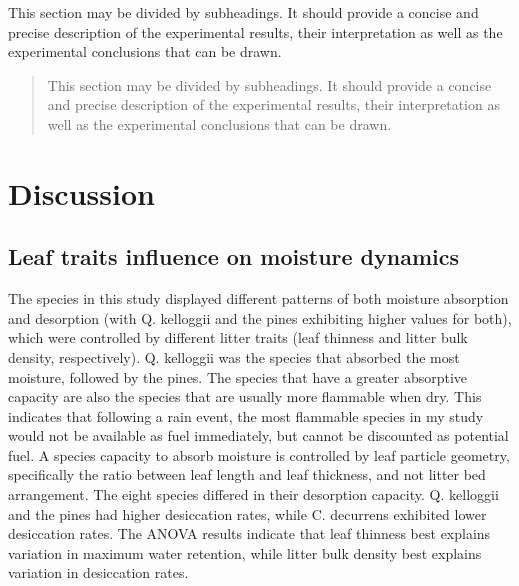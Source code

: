 \documentclass[fire,article,submit,moreauthors,pdftex]{Definitions/mdpi}
\begin{document}
This section may be divided by subheadings. It should provide a concise and precise description of the experimental results, their interpretation as well as the experimental conclusions that can be drawn.
\begin{quote}
This section may be divided by subheadings. It should provide a concise and precise description of the experimental results, their interpretation as well as the experimental conclusions that can be drawn.
\end{quote}



\section{Discussion}

\subsection{Leaf traits influence on moisture dynamics }

The species in this study displayed different patterns of both moisture absorption and desorption (with Q. kelloggii and the pines exhibiting higher values for both), which were controlled by different litter traits (leaf thinness and litter bulk density, respectively). Q. kelloggii was the species that absorbed the most moisture, followed by the pines. The species that have a greater absorptive capacity are also the species that are usually more flammable when dry. This indicates that following a rain event, the most flammable species in my study would not be available as fuel immediately, but cannot be discounted as potential fuel. A species capacity to absorb moisture is controlled by leaf particle geometry, specifically the ratio between leaf length and leaf thickness, and not litter bed arrangement. The eight species differed in their desorption capacity. Q. kelloggii and the pines had higher desiccation rates, while C. decurrens exhibited lower desiccation rates. The ANOVA results indicate that leaf thinness best explains variation in maximum water retention, while litter bulk density best explains variation in desiccation rates.
\end{document}
